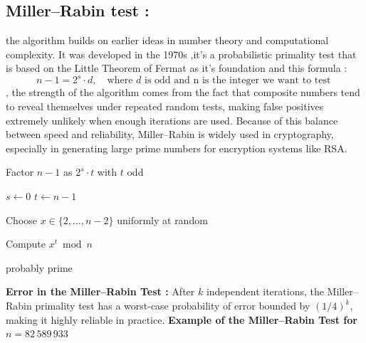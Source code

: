 \subsection{ Miller–Rabin test :}
 the algorithm builds on earlier ideas in number theory and computational complexity. It was developed in the 1970s ,it's a probabilistic primality test that is based on the Little Theorem of Fermat as it's foundation and this formula :
\[
n - 1 = 2^s \cdot d, \quad \text{where } d \text{ is odd and n is the integer we want to test }
\] , the strength of the algorithm comes from the fact that composite numbers tend to reveal themselves under repeated random tests, making false positives extremely unlikely when enough iterations are used. Because of this balance between speed and reliability, Miller–Rabin is widely used in cryptography, especially in generating large prime numbers for encryption systems like RSA.
\begin{algorithm}[H]
\caption{Miller--Rabin Primality Test\label{alg:mr}}



Factor $n-1$ as $2^s \cdot t$ with $t$ odd\;

$s \leftarrow 0$\;
$t \leftarrow n - 1$\;


Choose $x \in \{2, \dots, n-2\}$ uniformly at random\;

Compute $x^t \bmod n$\;


\Return probably prime\;
\end{algorithm}

\textbf{Error in  the Miller–Rabin Test :} After $k$ independent iterations, the Miller--Rabin primality test has a worst-case probability of error bounded by $(1/4)^k$, making it highly reliable in practice.
\textbf{Example of the Miller--Rabin Test for $n=82\,589\,933$}

